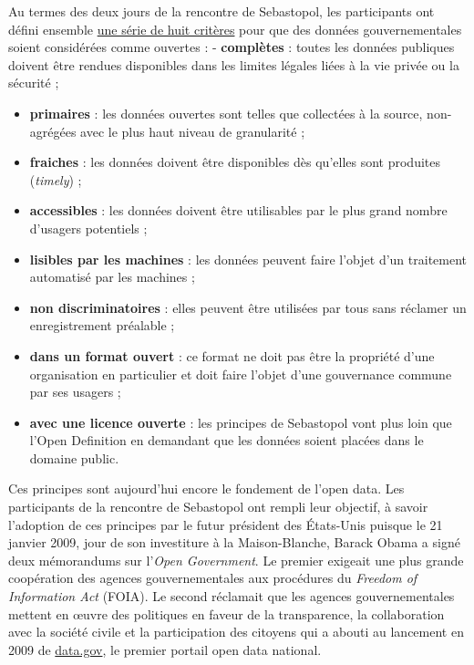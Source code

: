\documentclass[]{book}
\theoremstyle{definition}
\theoremstyle{definition}
\theoremstyle{definition}
\theoremstyle{remark}
\begin{document}
Au termes des deux jours de la rencontre de Sebastopol, les participants
ont défini ensemble \href{www.opengovdata.org}{une série de huit
critères} pour que des données gouvernementales soient considérées comme
ouvertes : - \textbf{complètes} : toutes les données publiques doivent
être rendues disponibles dans les limites légales liées à la vie privée
ou la sécurité ;

\begin{itemize}
\item
  \textbf{primaires} : les données ouvertes sont telles que collectées à
  la source, non-agrégées avec le plus haut niveau de granularité ;
\item
  \textbf{fraiches} : les données doivent être disponibles dès qu'elles
  sont produites (\emph{timely}) ;
\item
  \textbf{accessibles} : les données doivent être utilisables par le
  plus grand nombre d'usagers potentiels ;
\item
  \textbf{lisibles par les machines} : les données peuvent faire l'objet
  d'un traitement automatisé par les machines ;
\item
  \textbf{non discriminatoires} : elles peuvent être utilisées par tous
  sans réclamer un enregistrement préalable ;
\item
  \textbf{dans un format ouvert} : ce format ne doit pas être la
  propriété d'une organisation en particulier et doit faire l'objet
  d'une gouvernance commune par ses usagers ;
\item
  \textbf{avec une licence ouverte} : les principes de Sebastopol vont
  plus loin que l'Open Definition en demandant que les données soient
  placées dans le domaine public.
\end{itemize}

Ces principes sont aujourd'hui encore le fondement de l'open data. Les
participants de la rencontre de Sebastopol ont rempli leur objectif, à
savoir l'adoption de ces principes par le futur président des États-Unis
puisque le 21 janvier 2009, jour de son investiture à la Maison-Blanche,
Barack Obama a signé deux mémorandums sur l'\emph{Open Government}. Le
premier exigeait une plus grande coopération des agences
gouvernementales aux procédures du \emph{Freedom of Information Act}
(FOIA). Le second réclamait que les agences gouvernementales mettent en
œuvre des politiques en faveur de la transparence, la collaboration avec
la société civile et la participation des citoyens qui a abouti au
lancement en 2009 de \url{data.gov}, le premier portail open data
national.
\end{document}
